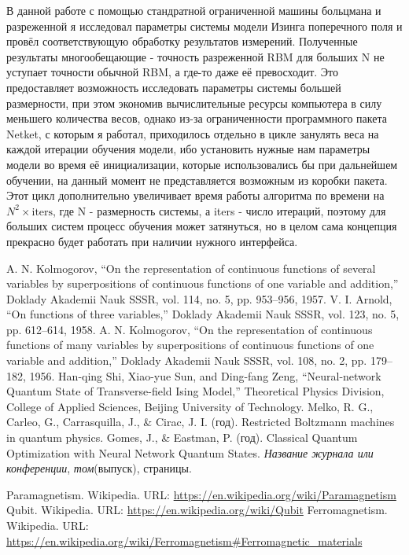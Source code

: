 В данной работе с помощью стандратной ограниченной машины больцмана и разреженной я исследовал параметры системы модели Изинга поперечного поля и провёл соответствующую обработку результатов измерений. Полученные результаты многообещающие - точность разреженной RBM для больших N не уступает точности обычной RBM, а где-то даже её превосходит. Это предоставляет возможность  исследовать параметры системы большей размерности, при этом экономив вычислительные ресурсы компьютера в силу меньшего количества весов, однако из-за ограниченности программного пакета Netket, с которым я работал, приходилось отдельно в цикле занулять веса на каждой итерации обучения модели, ибо установить нужные нам параметры модели во время её инициализации, которые использовались бы при дальнейшем обучении, на данный момент не представляется возможным из коробки пакета. Этот цикл дополнительно увеличивает время работы алгоритма по времени на \(N^2 \times \text{iters} \), где N - размерность системы, а iters - число итераций, поэтому для больших систем процесс обучения может затянуться, но в целом сама концепция прекрасно будет работать при наличии нужного интерфейса.


\newpage

\begin{thebibliography}{9}
     A. N. Kolmogorov, ``On the representation of continuous functions of several variables by superpositions of continuous functions of one variable and addition,'' Doklady Akademii Nauk SSSR, vol. 114, no. 5, pp. 953–956, 1957.
     V. I. Arnold, ``On functions of three variables,'' Doklady Akademii Nauk SSSR, vol. 123, no. 5, pp. 612–614, 1958.
     A. N. Kolmogorov, ``On the representation of continuous functions of many variables by superpositions of continuous functions of one variable and addition,'' Doklady Akademii Nauk SSSR, vol. 108, no. 2, pp. 179–182, 1956.
    Han-qing Shi, Xiao-yue Sun, and Ding-fang Zeng,
    ``Neural-network Quantum State of Transverse-field Ising Model,''
    Theoretical Physics Division, College of Applied Sciences, Beijing University of Technology.
    Melko, R. G., Carleo, G., Carrasquilla, J., & Cirac, J. I. (год). Restricted Boltzmann machines in quantum physics. 
        Gomes, J., & Eastman, P. (год). Classical Quantum Optimization with Neural Network Quantum States. \textit{Название журнала или конференции}, \textit{том}(выпуск), страницы. 
        
    Paramagnetism. Wikipedia. URL: \url{https://en.wikipedia.org/wiki/Paramagnetism}
    Qubit. Wikipedia. URL: \url{https://en.wikipedia.org/wiki/Qubit}
    Ferromagnetism. Wikipedia. URL: \url{https://en.wikipedia.org/wiki/Ferromagnetism#Ferromagnetic_materials}
\end{thebibliography}

